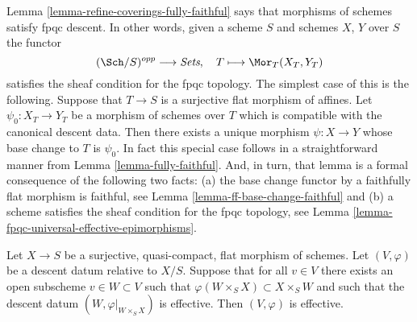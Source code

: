 \begin{remark}
\label{remark-morphisms-of-schemes-satisfy-fpqc-descent}
Lemma \ref{lemma-refine-coverings-fully-faithful}
says that morphisms of schemes satisfy fpqc descent.
In other words, given a scheme $S$ and schemes $X$, $Y$ over $S$
the functor
$$
(\Sch/S)^{opp} \longrightarrow \textit{Sets},
\quad
T \longmapsto \Mor_T(X_T, Y_T)
$$
satisfies the sheaf condition for the fpqc topology.
The simplest case of this is the following. Suppose that $T \to S$
is a surjective flat morphism of affines. Let $\psi_0 : X_T \to Y_T$
be a morphism of schemes over $T$ which is compatible with the
canonical descent data. Then there exists a unique morphism
$\psi : X \to Y$ whose base change to $T$ is $\psi_0$. In fact this
special case follows in a straightforward manner from
Lemma \ref{lemma-fully-faithful}.
And, in turn, that lemma is a formal consequence of the following
two facts:
(a) the base change functor by a faithfully flat morphism is faithful, see
Lemma \ref{lemma-ff-base-change-faithful}
and (b) a scheme satisfies the sheaf condition for the fpqc topology, see
Lemma \ref{lemma-fpqc-universal-effective-epimorphisms}.
\end{remark}

\begin{lemma}
\label{lemma-effective-for-fpqc-is-local-upstairs}
Let $X \to S$ be a surjective, quasi-compact, flat morphism of
schemes. Let $(V, \varphi)$ be a descent datum relative to $X/S$.
Suppose that for all $v \in V$ there exists an open subscheme
$v \in W \subset V$ such that $\varphi(W \times_S X) \subset X \times_S W$
and such that the descent datum $(W, \varphi|_{W \times_S X})$
is effective. Then $(V, \varphi)$ is effective.
\end{lemma}

